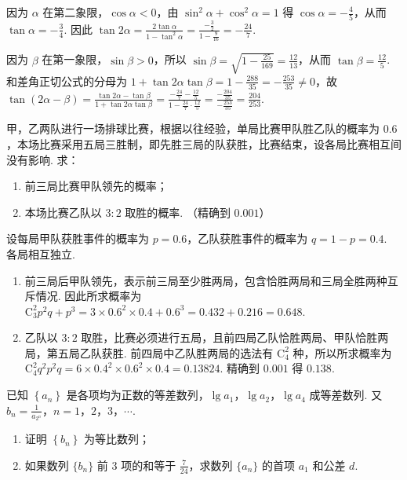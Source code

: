 \begin{solution}
因为 \(\alpha\) 在第二象限，\(\cos\alpha<0\)，由 \(\sin^{2}\alpha+\cos^{2}\alpha=1\) 得 \(\cos\alpha=-\frac45\)，从而 \(\tan\alpha=-\frac34\). 因此
\(\tan2\alpha=\frac{2\tan\alpha}{1-\tan^{2}\alpha}=\frac{-\frac32}{1-\frac{9}{16}}=-\frac{24}{7}\).

因为 \(\beta\) 在第一象限，\(\sin\beta>0\)，所以 \(\sin\beta=\sqrt{1-\frac{25}{169}}=\frac{12}{13}\)，从而 \(\tan\beta=\frac{12}{5}\). 和差角正切公式的分母为 \(1+\tan2\alpha\tan\beta=1-\frac{288}{35}=-\frac{253}{35}\ne0\)，故
\(\tan(2\alpha-\beta)=\frac{\tan2\alpha-\tan\beta}{1+\tan2\alpha\tan\beta}=\frac{-\frac{24}{7}-\frac{12}{5}}{1-\frac{24}{7}\cdot\frac{12}{5}}=\frac{-\frac{204}{35}}{-\frac{253}{35}}=\frac{204}{253}\).
\end{solution}

\begin{problem}
甲，乙两队进行一场排球比赛，根据以往经验，单局比赛甲队胜乙队的概率为 \(0.6\)，本场比赛采用五局三胜制，即先胜三局的队获胜，比赛结束，设各局比赛相互间没有影响. 求：

\begin{enumerate}
\item 前三局比赛甲队领先的概率；
\item 本场比赛乙队以 \(3:2\) 取胜的概率. （精确到 \(0.001\)）
\end{enumerate}
\end{problem}

\begin{solution}
设每局甲队获胜事件的概率为 \(p=0.6\)，乙队获胜事件的概率为 \(q=1-p=0.4\). 各局相互独立.

\begin{enumerate}
\item 前三局后甲队领先，表示前三局至少胜两局，包含恰胜两局和三局全胜两种互斥情况. 因此所求概率为 \(\mathrm C_{3}^{2}p^{2}q+p^{3}=3\times0.6^{2}\times0.4+0.6^{3}=0.432+0.216=0.648\).
\item 乙队以 \(3:2\) 取胜，比赛必须进行五局，且前四局乙队恰胜两局、甲队恰胜两局，第五局乙队获胜. 前四局中乙队胜两局的选法有 \(\mathrm C_{4}^{2}\) 种，所以所求概率为 \(\mathrm C_{4}^{2}q^{2}p^{2}q=6\times0.4^{2}\times0.6^{2}\times0.4=0.13824\). 精确到 \(0.001\) 得 \(0.138\).
\end{enumerate}
\end{solution}

\begin{problem}
已知 \(\left\{a_{n}\right\}\) 是各项均为正数的等差数列，\(\lg a_{1}\)，\(\lg a_{2}\)，\(\lg a_{4}\) 成等差数列. 又 \(b_{n} = \frac{1}{a_{2^{n}}}\)，\(n = 1\)，\(2\)，\(3\)，\(\cdots\).

\begin{enumerate}
\item 证明 \(\left\{b_{n}\right\}\) 为等比数列；
\item 如果数列 \(\{b_n\}\) 前 \(3\) 项的和等于 \(\frac{7}{24}\)，求数列 \(\{a_n\}\) 的首项 \(a_1\) 和公差 \(d\).
\end{enumerate}
\end{problem}

